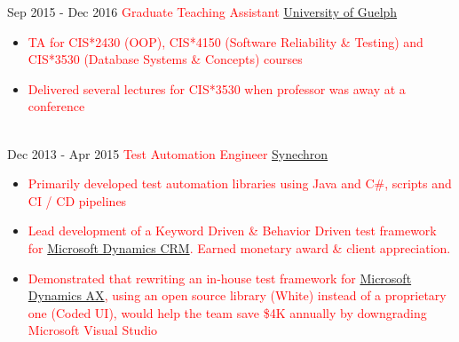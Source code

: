 \documentclass[letterpaper]{twentysecondcv} %
\begin{document}
\begin{twenty}
    \twentyitem
   		{Sep 2015 -}
		{Dec 2016}
        {\textcolor{red}{Graduate Teaching Assistant}}
        {\href{http://www.uoguelph.ca}{University of Guelph}}
        {}
        {
        {\begin{itemize}
        \item \textcolor{red}{TA for CIS*2430 (OOP), CIS*4150 (Software Reliability \& Testing) and CIS*3530 (Database Systems \& Concepts) courses}
        \item \textcolor{red}{Delivered several lectures for CIS*3530 when professor was away at a conference}
    \end{itemize}}
        }
     \\
     \twentyitem
   		{Dec 2013 -}
		{Apr 2015}
        {\textcolor{red}{Test Automation Engineer}}
        {\href{http://www.synechron.com/}{Synechron}}
        {}
        {
        \begin{itemize}
        \item \textcolor{red}{Primarily developed test automation libraries using Java and C\#, scripts and CI / CD pipelines}
        \item \textcolor{red}{Lead development of a Keyword Driven \& Behavior Driven test framework for \href{https://www.microsoft.com/en-ca/dynamics/crm.aspx}{Microsoft Dynamics CRM}. Earned monetary award \& client appreciation.}
        \item \textcolor{red}{Demonstrated that rewriting an in-house test framework for \href{https://www.microsoft.com/en-ca/dynamics/erp-ax-overview.aspx}{Microsoft Dynamics AX}, using an open source library (White) instead of a proprietary one (Coded UI), would help the team save \$4K annually by downgrading Microsoft Visual Studio}
    \end{itemize}
    	}
        
\end{twenty}

\end{document}
